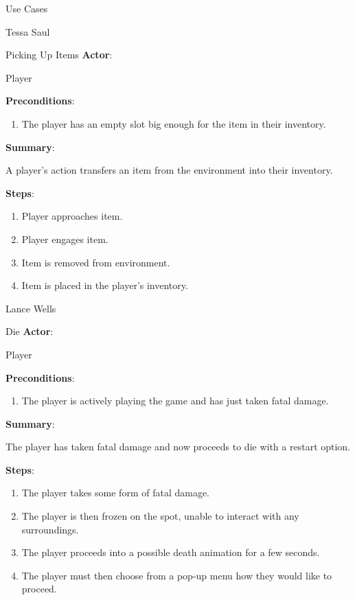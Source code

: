 \documentclass[12pt]{report}
\begin{document}
\begin{section}{Use Cases}
\begin{subsection}{Tessa Saul}
\begin{subsubsection}{Picking Up Items}
\textbf{Actor}:

Player

\textbf{Preconditions}:

\begin{enumerate}
\item The player has an empty slot big enough for the item in their
inventory.
\end{enumerate}

\textbf{Summary}:

A player's action transfers an item from the environment into their
inventory.

\textbf{Steps}:

\begin{enumerate}
\item Player approaches item.
\item Player engages item.
\item Item is removed from environment.
\item Item is placed in the player's  inventory.
\end{enumerate}
\end{subsubsection}
\end{subsection}

\begin{subsection}{Lance Wells}
\begin{subsubsection}{Die}
\textbf{Actor}:

Player

\textbf{Preconditions}:

\begin{enumerate}
\item The player is actively playing the game and has just taken
fatal damage.
\end{enumerate}

\textbf{Summary}:

The player has taken fatal damage and now proceeds to die with a
restart option.

\textbf{Steps}:

\begin{enumerate}
\item The player takes some form of fatal damage.
\item The player is then frozen on the spot, unable to interact with any
surroundings.
\item The player proceeds into a possible death animation for a few seconds.
\item The player must then choose from a pop-up menu how they would like to
proceed.
\end{enumerate}
\end{subsubsection}


\end{subsection}
\end{section}
\end{document}
